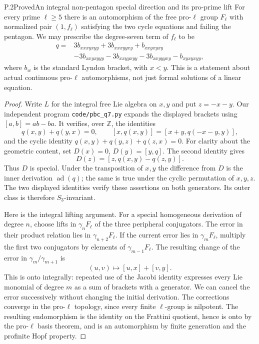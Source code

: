 \begin{statement}{P.2}{Proved}{An integral non-pentagon special direction and its pro-prime lift}
For every prime $\ell\geq5$ there is an automorphism of the free
pro-$\ell$ group $F_\ell$ with normalized pair $(1,f_\ell)$ satisfying
the two cycle equations and failing the pentagon. We may prescribe
the degree-seven term of $f_\ell$ to be
\[
\begin{split}
 q={}&3b_{xxxyxyy}+3b_{xxxyyxy}+b_{xxyxyxy}\\
 &-3b_{xxyxyyy}-3b_{xxyyxyy}-3b_{xxyyyxy}-b_{xyxyxyy},
\end{split}
\]
where $b_w$ is the standard Lyndon bracket, with $x<y$.
This is a statement about actual continuous pro-$\ell$ automorphisms,
not just formal solutions of a linear equation.
\end{statement}
\begin{proof}
Write $L$ for the integral free Lie algebra on $x,y$ and put $z=-x-y$.
Our independent program \texttt{code/pbc\_q7.py} expands the displayed
brackets using $[a,b]=ab-ba$. It verifies, over $\mathbb Z$, the
identities
\[
 q(x,y)+q(y,x)=0,\qquad
 [x,q(x,y)]=[x+y,q(-x-y,y)],
\]
and the cyclic identity $q(x,y)+q(y,z)+q(z,x)=0$.
For clarity about the geometric content, set
$D(x)=0$, $D(y)=[y,q]$. The second identity gives
\[
 D(z)=[z,q(x,y)-q(z,y)].
\]
Thus $D$ is special. Under the transposition of $x,y$ the difference
from $D$ is the inner derivation $\operatorname{ad}(q)$; the same is
true under the cyclic permutation of $x,y,z$. The two displayed
identities verify these assertions on both generators. Its outer
class is therefore $S_3$-invariant.

Here is the integral lifting argument. For a special homogeneous
derivation of degree $n$, choose lifts in $\gamma_nF_\ell$ of the
three peripheral conjugators. The error in their product relation
lies in $\gamma_{n+2}F_\ell$. If the current error lies in
$\gamma_mF_\ell$, multiply the first two conjugators by elements of
$\gamma_{m-1}F_\ell$. The resulting change of the error in
$\gamma_m/\gamma_{m+1}$ is
\[
                  (u,v)\longmapsto[u,x]+[v,y].
\]
This is onto integrally: repeated use of the Jacobi identity expresses
every Lie monomial of degree $m$ as a sum of brackets with a generator.
We can cancel the error successively without changing the initial
derivation. The corrections converge in the pro-$\ell$ topology,
since every finite $\ell$-group is nilpotent. The resulting
endomorphism is the identity on the Frattini quotient, hence is onto
by the pro-$\ell$ basis theorem, and is an automorphism by finite
generation and the profinite Hopf property.


\end{proof}
